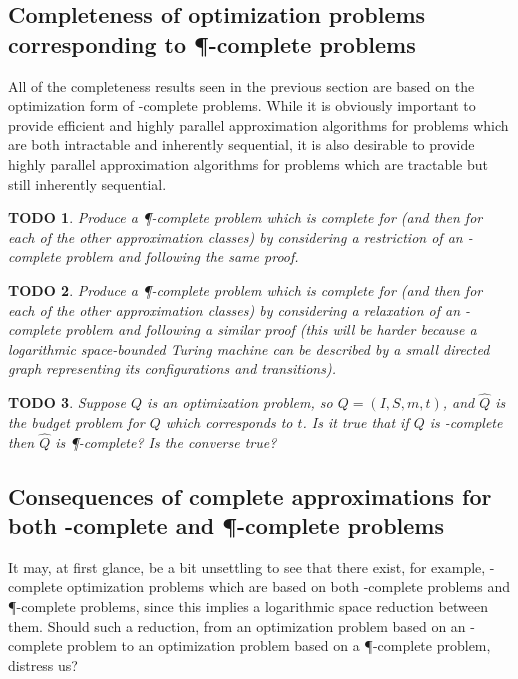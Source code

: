 \documentclass[]{article}
\theoremstyle{plain}
\newtheorem{todo}{TODO}
\theoremstyle{definition}
\begin{document}
\subsection{Completeness of optimization problems corresponding to \texorpdfstring{\P}{P}-complete problems}
\label{sec:pcompleteapprox}

All of the completeness results seen in the previous section are based on the optimization form of \NP-complete problems.
While it is obviously important to provide efficient and highly parallel approximation algorithms for problems which are both intractable and inherently sequential, it is also desirable to provide highly parallel approximation algorithms for problems which are tractable but still inherently sequential.

\begin{todo}
  Produce a \P-complete problem which is complete for \ApxNCO{} (and then for each of the other approximation classes) by considering a restriction of an \NP-complete problem and following the same proof.
\end{todo}

\begin{todo}
  Produce a \P-complete problem which is complete for \ApxNCO{} (and then for each of the other approximation classes) by considering a relaxation of an \NL-complete problem and following a similar proof (this will be harder because a logarithmic space-bounded Turing machine can be described by a small directed graph representing its configurations and transitions).
\end{todo}

\begin{todo}
  Suppose $Q$ is an optimization problem, so $Q=(I, S, m, t)$, and $\hat{Q}$ is the budget problem for $Q$ which corresponds to $t$.
  Is it true that if $Q$ is \PO-complete then $\hat{Q}$ is \P-complete?
  Is the converse true?
\end{todo}

\subsection{Consequences of complete approximations for both \texorpdfstring{\NP}{NP}-complete and \texorpdfstring{\P}{P}-complete problems}

It may, at first glance, be a bit unsettling to see that there exist, for example, \ApxNCO-complete optimization problems which are based on both \NP-complete problems and \P-complete problems, since this implies a logarithmic space reduction between them.
Should such a reduction, from an optimization problem based on an \NP-complete problem to an optimization problem based on a \P-complete problem, distress us?
\end{document}
